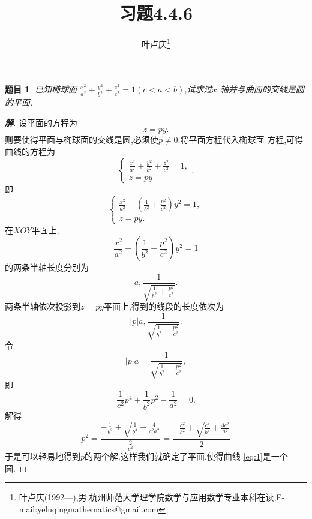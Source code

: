 \documentclass[a4paper]{article}
\newtheorem*{exe}{题目}
\newenvironment{exercise}
{\bigskip\begin{mdframed}\begin{exe}}
    {\end{exe}\end{mdframed}\bigskip}
\begin{document}
\title{\huge{\bf{习题4.4.6}}} \author{\small{叶卢庆\footnote{叶卢庆(1992---),男,杭州师范大学理学院数学与应用数学专业本科在读,E-mail:yeluqingmathematics@gmail.com}}}
\maketitle
\begin{exercise}
  已知椭球面
  $\frac{x^2}{a^2}+\frac{y^2}{b^2}+\frac{z^2}{c^2}=1(c<a<b)$,试求过$x$
  轴并与曲面的交线是圆的平面.
\end{exercise}
\begin{proof}[\textbf{解}]
设平面的方程为
$$
z=py.
$$
则要使得平面与椭球面的交线是圆,必须使$p\neq 0$.将平面方程代入椭球面
方程,可得曲线的方程为
$$
\begin{cases}
  \frac{x^2}{a^2}+\frac{y^2}{b^2}+\frac{z^2}{c^2}=1,\\
z=py
\end{cases}.
$$
即
\begin{equation}\label{eq:1}
\begin{cases}
  \frac{x^2}{a^2}+(\frac{1}{b^2}+\frac{p^2}{c^2})y^2=1,\\
z=py.
\end{cases}
\end{equation}
在$XOY$平面上,
$$
\frac{x^2}{a^2}+(\frac{1}{b^2}+\frac{p^2}{c^2})y^2=1
$$
的两条半轴长度分别为
$$
a,\frac{1}{\sqrt{\frac{1}{b^2}+\frac{p^2}{c^2}}}.
$$
两条半轴依次投影到$z=py$平面上,得到的线段的长度依次为
$$
|p|a,\frac{1}{\sqrt{\frac{1}{b^2}+\frac{p^2}{c^2}}}.
$$
令
$$
|p|a=\frac{1}{\sqrt{\frac{1}{b^2}+\frac{p^2}{c^2}}},
$$
即
$$
\frac{1}{c^2}p^4+\frac{1}{b^2}p^2-\frac{1}{a^2}=0.
$$
解得
$$
p^2=\frac{-\frac{1}{b^2}+\sqrt{\frac{1}{b^4}+\frac{4}{c^2a^2}}}{\frac{2}{c^2}}=\frac{-\frac{c^2}{b^2}+\sqrt{\frac{c^4}{b^4}+\frac{4c^2}{a^2}}}{2}
$$
于是可以轻易地得到$p$的两个解.这样我们就确定了平面,使得曲线
\eqref{eq:1}是一个圆.
\end{proof}
\end{document}
